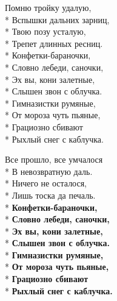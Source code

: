 \medskip

\begin{minipage}{\linewidth}
Помню тройку удалую,\\*
Вспышки дальних зарниц,\\*
Твою позу усталую,\\*
Трепет длинных ресниц.\\*
\hspace*{1.5em}Конфетки-бараночки,\\*
\hspace*{1.5em}Словно лебеди, саночки,\\*
\hspace*{1.5em}Эх вы, кони залетные,\\*
\hspace*{1.5em}Слышен звон с облучка.\\*
\hspace*{1.5em}Гимназистки румяные,\\*
\hspace*{1.5em}От мороза чуть пьяные,\\*
\hspace*{1.5em}Грациозно сбивают\\*
\hspace*{1.5em}Рыхлый снег с каблучка.\\
\end{minipage}\par\medskip\nobreak

\medskip

\begin{minipage}{\linewidth}
Все прошло, все умчалося\\*
В невозвратную даль.\\*
Ничего не осталося,\\*
Лишь тоска да печаль.\\*
\hspace*{1.5em}\textbf{Конфетки-бараночки,}\\*
\hspace*{1.5em}\textbf{Словно лебеди, саночки,}\\*
\hspace*{1.5em}\textbf{Эх вы, кони залетные,}\\*
\hspace*{1.5em}\textbf{Слышен звон с облучка.}\\*
\hspace*{1.5em}\textbf{Гимназистки румяные,}\\*
\hspace*{1.5em}\textbf{От мороза чуть пьяные,}\\*
\hspace*{1.5em}\textbf{Грациозно сбивают}\\*
\hspace*{1.5em}\textbf{Рыхлый снег с каблучка.}\\
\end{minipage}

